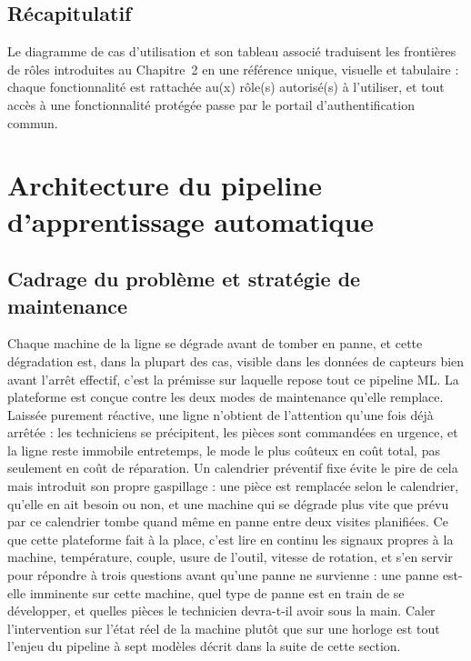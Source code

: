\subsection{Récapitulatif}

Le diagramme de cas d'utilisation et son tableau associé traduisent les frontières de rôles introduites au Chapitre~2 en une référence unique, visuelle et tabulaire : chaque fonctionnalité est rattachée au(x) rôle(s) autorisé(s) à l'utiliser, et tout accès à une fonctionnalité protégée passe par le portail d'authentification commun.

\section{Architecture du pipeline d'apprentissage automatique}
\label{sec:ml-pipeline-architecture}

\subsection{Cadrage du problème et stratégie de maintenance}

Chaque machine de la ligne se dégrade avant de tomber en panne, et cette dégradation est, dans la plupart des cas, visible dans les données de capteurs bien avant l'arrêt effectif, c'est la prémisse sur laquelle repose tout ce pipeline ML. La plateforme est conçue contre les deux modes de maintenance qu'elle remplace. Laissée purement réactive, une ligne n'obtient de l'attention qu'une fois déjà arrêtée : les techniciens se précipitent, les pièces sont commandées en urgence, et la ligne reste immobile entretemps, le mode le plus coûteux en coût total, pas seulement en coût de réparation. Un calendrier préventif fixe évite le pire de cela mais introduit son propre gaspillage : une pièce est remplacée selon le calendrier, qu'elle en ait besoin ou non, et une machine qui se dégrade plus vite que prévu par ce calendrier tombe quand même en panne entre deux visites planifiées. Ce que cette plateforme fait à la place, c'est lire en continu les signaux propres à la machine, température, couple, usure de l'outil, vitesse de rotation, et s'en servir pour répondre à trois questions avant qu'une panne ne survienne : une panne est-elle imminente sur cette machine, quel type de panne est en train de se développer, et quelles pièces le technicien devra-t-il avoir sous la main. Caler l'intervention sur l'état réel de la machine plutôt que sur une horloge est tout l'enjeu du pipeline à sept modèles décrit dans la suite de cette section.

